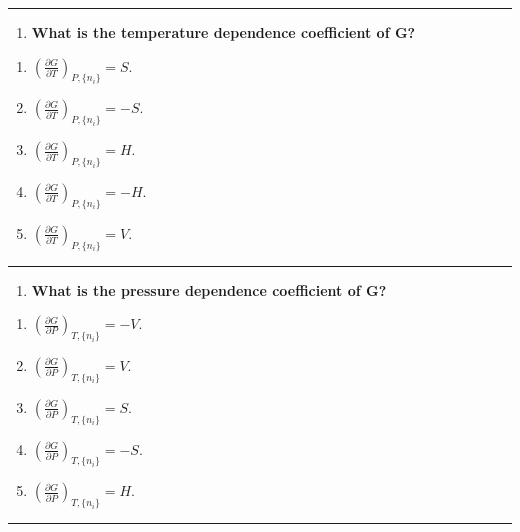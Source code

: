 \documentclass[
  9pt,
]{extbook}
\providecommand{\tightlist}{%
  \setlength{\itemsep}{0pt}\setlength{\parskip}{0pt}}
\theoremstyle{definition}
\theoremstyle{definition}
\theoremstyle{definition}
\theoremstyle{definition}
\theoremstyle{remark}
\begin{document}
\begin{center}\rule{0.5\linewidth}{0.5pt}\end{center}

\begin{enumerate}
\def\labelenumi{\arabic{enumi}.}
\setcounter{enumi}{3}
\tightlist
\item
  \textbf{What is the temperature dependence coefficient of G?}
\end{enumerate}

\begin{enumerate}
\def\labelenumi{\alph{enumi}.}
\tightlist
\item
  \(\left(\frac{\partial G}{\partial T}\right)_{P,\{n_i\}} = S\).
\item
  \(\left(\frac{\partial G}{\partial T}\right)_{P,\{n_i\}} = -S\).
\item
  \(\left(\frac{\partial G}{\partial T}\right)_{P,\{n_i\}} = H\).
\item
  \(\left(\frac{\partial G}{\partial T}\right)_{P,\{n_i\}} = -H\).
\item
  \(\left(\frac{\partial G}{\partial T}\right)_{P,\{n_i\}} = V\).
\end{enumerate}

\begin{center}\rule{0.5\linewidth}{0.5pt}\end{center}

\begin{enumerate}
\def\labelenumi{\arabic{enumi}.}
\setcounter{enumi}{4}
\tightlist
\item
  \textbf{What is the pressure dependence coefficient of G?}
\end{enumerate}

\begin{enumerate}
\def\labelenumi{\alph{enumi}.}
\tightlist
\item
  \(\left(\frac{\partial G}{\partial P}\right)_{T,\{n_i\}} = -V\).
\item
  \(\left(\frac{\partial G}{\partial P}\right)_{T,\{n_i\}} = V\).
\item
  \(\left(\frac{\partial G}{\partial P}\right)_{T,\{n_i\}} = S\).
\item
  \(\left(\frac{\partial G}{\partial P}\right)_{T,\{n_i\}} = -S\).
\item
  \(\left(\frac{\partial G}{\partial P}\right)_{T,\{n_i\}} = H\).
\end{enumerate}

\begin{center}\rule{0.5\linewidth}{0.5pt}\end{center}
\end{document}
